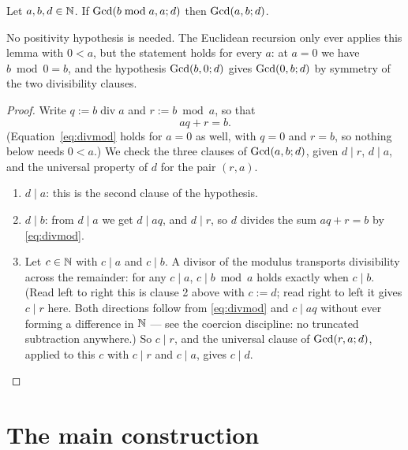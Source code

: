\begin{lemma}
  \leanok
  \label{lem:is_gcd_of_mod}
  Let $a, b, d \in \mathbb{N}$. If $\mathrm{Gcd}(b \bmod a,a;d)$ then $\mathrm{Gcd}(a,b;d)$.

  No positivity hypothesis is needed. The Euclidean recursion only ever
  applies this lemma with $0 < a$, but the statement holds for every $a$: at
  $a = 0$ we have $b \bmod 0 = b$, and the hypothesis $\mathrm{Gcd}(b,0;d)$ gives
  $\mathrm{Gcd}(0,b;d)$ by symmetry of the two divisibility clauses.
\end{lemma}
\begin{proof}
  \leanok
  Write $q := b \operatorname{div} a$ and $r := b \bmod a$, so that
  \begin{equation}\label{eq:divmod}
    a q + r = b .
  \end{equation}
  (Equation~\eqref{eq:divmod} holds for $a = 0$ as well, with $q = 0$ and
  $r = b$, so nothing below needs $0 < a$.)
  We check the three clauses of $\mathrm{Gcd}(a,b;d)$, given $d \mid r$, $d \mid a$,
  and the universal property of $d$ for the pair $(r, a)$.
  \begin{enumerate}
    \item $d \mid a$: this is the second clause of the hypothesis.
    \item $d \mid b$: from $d \mid a$ we get $d \mid a q$, and $d \mid r$, so
      $d$ divides the sum $a q + r = b$ by \eqref{eq:divmod}.
    \item Let $c \in \mathbb{N}$ with $c \mid a$ and $c \mid b$. A divisor of the
      modulus transports divisibility across the remainder: for any $c \mid a$,
      $c \mid b \bmod a$ holds exactly when $c \mid b$. (Read left to right this
      is clause 2 above with $c := d$; read right to left it gives $c \mid r$
      here. Both directions follow from \eqref{eq:divmod} and $c \mid aq$
      without ever forming a difference in $\mathbb{N}$ --- see the coercion
      discipline: no truncated subtraction anywhere.) So $c \mid r$, and the
      universal clause of $\mathrm{Gcd}(r,a;d)$, applied to this $c$ with $c \mid r$
      and $c \mid a$, gives $c \mid d$.
  \end{enumerate}
\end{proof}

\section{The main construction}

